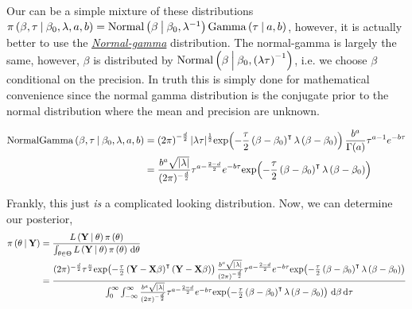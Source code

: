 Our can be a simple mixture of these distributions $\pi \left( \beta,\tau \:\middle|\: \beta_0,\lambda,a,b \right)=\mathrm{Normal}\left( \beta \:\middle|\: \beta_0,\lambda^{-1} \right)\mathrm{Gamma}\left( \tau \:\middle|\: a,b \right)$, however, it is actually better to use the \href{https://en.wikipedia.org/wiki/Normal-gamma_distribution}{\textit{Normal-gamma}} distribution. The normal-gamma is largely the same, however, $\beta$ is distributed by $\mathrm{Normal}\left( \beta \:\middle|\: \beta_0, \left(\lambda\tau\right)^{-1} \right)$, i.e. we choose $\beta$ conditional on the precision. In truth this is simply done for mathematical convenience since the normal gamma distribution is the conjugate prior to the normal distribution where the mean and precision are unknown. 

\begin{align*}
    \mathrm{NormalGamma}\left( \beta,\tau \:\middle|\: \beta_0,\lambda,a,b \right) &= \left(2\pi\right)^{-\frac{d}{2}}|\lambda\tau|^{\frac{1}{2}}\mathrm{exp}\!\left( -\frac{\tau}{2}\left(\beta-\beta_0\right)^\intercal\lambda\left(\beta-\beta_0\right) \right)\frac{b^a}{\Gamma(a)}\tau^{a-1}e^{-b\tau}\\ 
    &= \frac{b^a\sqrt{|\lambda|}}{(2\pi)^{-\frac{d}{2}}} \tau^{a-\frac{2-d}{2}}e^{-b\tau}\mathrm{exp}\!\left( -\frac{\tau}{2}\left(\beta-\beta_0\right)^\intercal\lambda\left(\beta-\beta_0\right) \right)
\end{align*}

Frankly, this just \textit{is} a complicated looking distribution. Now, we can determine our posterior,
\begin{align*}
    \pi \left( \theta \:\middle|\: \mathbf{Y} \right) &= \frac{L\left( \mathbf{Y} \:\middle|\: \theta \right)\pi\left( \theta \right)}{\int_{\theta\in\Theta}L\left( \mathbf{Y} \:\middle|\: \theta \right)\pi\left( \theta \right)\,\mathrm{d}\theta}\\ 
    &= \frac{(2\pi)^{-\frac{d}{2}}\tau^{\frac{n}{2}}\mathrm{exp}\!\left( -\frac{\tau}{2}\left(\mathbf{Y} - \mathbf{X}\beta\right)^\intercal\left(\mathbf{Y} - \mathbf{X}\beta\right) \right)\frac{b^a\sqrt{|\lambda|}}{(2\pi)^{-\frac{d}{2}}} \tau^{a-\frac{2-d}{2}}e^{-b\tau}\mathrm{exp}\!\left( -\frac{\tau}{2}\left(\beta-\beta_0\right)^\intercal\lambda\left(\beta-\beta_0\right) \right)}{\int_0^\infty\int_{-\infty}^\infty \frac{b^a\sqrt{|\lambda|}}{(2\pi)^{-\frac{d}{2}}} \tau^{a-\frac{2-d}{2}}e^{-b\tau}\mathrm{exp}\!\left( -\frac{\tau}{2}\left(\beta-\beta_0\right)^\intercal\lambda\left(\beta-\beta_0\right) \right)\,\mathrm{d}\beta\,\mathrm{d}\tau}
\end{align*}

